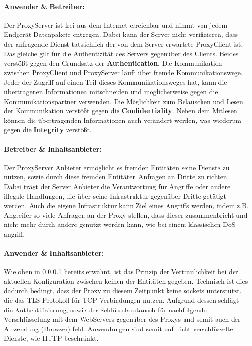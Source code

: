 \documentclass[12pt, a4paper]{scrartcl}
\begin{document}
\paragraph{Anwender \& Betreiber:}\label{ssec::anwender}
\noindent Der ProxyServer ist frei aus dem Internet erreichbar und nimmt von jedem Endgerät Datenpakete entgegen. Dabei kann der Server nicht verifizieren, dass der anfragende Dienst tatsächlich der von dem Server erwartete ProxyClient ist. Das gleiche gilt für die Authentizität des Servers gegenüber des Clients. Beides verstößt gegen den Grundsatz der \textbf{Authentication}.\newline
Die Kommunikation zwischen ProxyClient und ProxyServer läuft über fremde Kommunikationswege. Jeder der Zugriff auf einen Teil dieses Kommunikationsweges hat, kann die übertragenen Informationen mitschneiden und möglicherweise gegen die Kommunikationspartner verwenden. Die Möglichkeit zum Belauschen und Lesen der Kommunikation verstößt gegen die \textbf{Confidentiality}.\newline
Neben dem Mitlesen können die übertragenden Informationen auch verändert werden, was wiederum gegen die \textbf{Integrity} verstößt.
\paragraph{Betreiber \& Inhaltsanbieter:}
Der ProxyServer Anbieter ermöglicht es fremden Entitäten seine Dienste zu nutzen, sowie durch diese fremden Entitäten Anfragen an Dritte zu richten. Dabei trägt der Server Anbieter die Verantwortung für Angriffe oder andere illegale Handlungen, die über seine Infrastruktur gegenüber Dritte getätigt werden.\newline
Auch die eigene Infrastruktur kann Ziel eines Angriffs werden, indem z.B. Angreifer so viele Anfragen an der Proxy stellen, dass dieser zusammenbricht und nicht mehr durch andere genutzt werden kann, wie bei einem klassischen \ac{DoS} angriff.
\paragraph{Anwender \& Inhaltsanbieter:}
Wie oben in \ref{ssec::anwender} bereits erwähnt, ist das Prinzip der Vertraulichkeit bei der aktuellen Konfiguration zwischen keinen der Entitäten gegeben. Technisch ist dies dadurch bedingt, dass der Proxy zu diesem Zeitpunkt keine sockets unterstützt, die das \ac{TLS}-Protokoll für TCP Verbindungen nutzen. Aufgrund dessen schlägt die Authentifizierung, sowie der Schlüsselaustausch für nachfolgende Verschlüsselung mit dem WebServers gegenüber des Proxys und somit auch der Anwendung (Browser) fehl. Anwendungen sind somit auf nicht verschlüsselte Dienste, wie \acs{HTTP} beschränkt.
\end{document}
